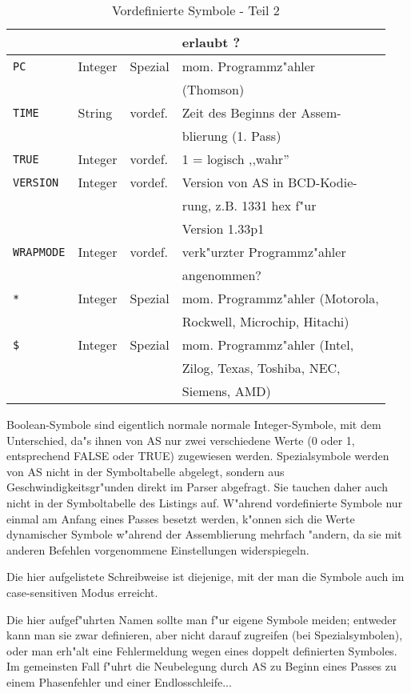 \documentclass[12pt,a4paper,twoside]{report}
\newcommand{\tty}[1]{{\tt #1}}
\begin{document}
\begin{table*}
\begin{center}
\begin{tabular}{|l|l|l|l|}
                 &             &            & erlaubt ? \\
\hline
\tty{PC}         &  Integer    & Spezial    & mom. Programmz"ahler \\
                 &             &            & (Thomson) \\
\hline
\tty{TIME}       &  String     & vordef.    & Zeit des Beginns der Assem- \\
                 &             &            & blierung (1. Pass) \\
\hline
\tty{TRUE}       &  Integer    & vordef.    & 1 = logisch ,,wahr'' \\
\hline
\tty{VERSION}    &  Integer    & vordef.    & Version von AS in BCD-Kodie- \\
                 &             &            & rung, z.B. 1331 hex f"ur \\
                 &             &            & Version 1.33p1 \\
\hline
\tty{WRAPMODE}   &  Integer    & vordef.    & verk"urzter Programmz"ahler \\
                 &             &            & angenommen? \\
\hline
\verb!*!         &  Integer    & Spezial    & mom. Programmz"ahler (Motorola, \\
                 &             &            & Rockwell, Microchip, Hitachi) \\
\hline
\tty{\$}         &  Integer    & Spezial    & mom. Programmz"ahler (Intel, \\
                 &             &            & Zilog, Texas, Toshiba, NEC, \\
                 &             &            & Siemens, AMD) \\
\hline
\end{tabular}\end{center}
\caption{Vordefinierte Symbole - Teil 2\label{TabInternSyms2}}
\end{table*}
\par
Boolean-Symbole sind eigentlich normale normale Integer-Symbole, mit
dem Unterschied, da"s ihnen von AS nur zwei verschiedene Werte (0 oder
1, entsprechend FALSE oder TRUE) zugewiesen werden.  Spezialsymbole
werden von AS nicht in der Symboltabelle abgelegt, sondern aus
Geschwindigkeitsgr"unden direkt im Parser abgefragt.  Sie tauchen daher
auch nicht in der Symboltabelle des Listings auf.  W"ahrend vordefinierte
Symbole nur einmal am Anfang eines Passes besetzt werden, k"onnen sich
die Werte dynamischer Symbole w"ahrend der Assemblierung mehrfach "andern,
da sie mit anderen Befehlen vorgenommene Einstellungen widerspiegeln.
\par
Die hier aufgelistete Schreibweise ist diejenige, mit der man die
Symbole auch im case-sensitiven Modus erreicht.
\par
Die hier aufgef"uhrten Namen sollte man f"ur eigene Symbole meiden;
entweder kann man sie zwar definieren, aber nicht darauf zugreifen
(bei Spezialsymbolen), oder man erh"alt eine Fehlermeldung wegen eines
doppelt definierten Symboles.  Im gemeinsten Fall f"uhrt die Neubelegung
durch AS zu Beginn eines Passes zu einem Phasenfehler und einer
Endlosschleife...
\end{document}

